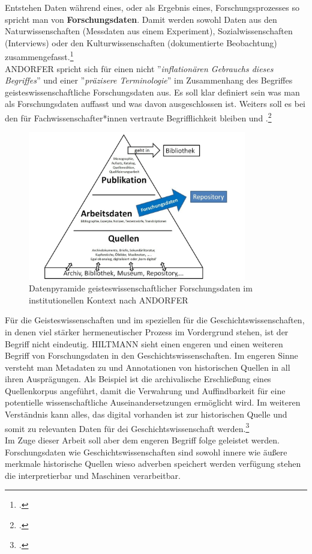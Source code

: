 \documentclass[12pt,a4paper]{article}
\begin{document}
Entstehen Daten während eines, oder als Ergebnis eines, Forschungsprozesses so spricht man von \textbf{Forschungsdaten}. Damit werden sowohl Daten aus den Naturwissenschaften (Messdaten aus einem Experiment), Sozialwissenschaften (Interviews) oder den Kulturwissenschaften (dokumentierte Beobachtung) zusammengefasst.\footcite[][09.06.2019]{kindling2013forschungsdatenmanagement}
\\
ANDORFER spricht sich für einen nicht ''\textit{inflationären Gebrauchs dieses Begriffes}'' und einer ''\textit{präzisere   Terminologie}'' im Zusammenhang des Begriffes geisteswissenschaftliche Forschungsdaten aus. Es soll klar definiert sein was man als Forschungsdaten auffasst und was davon ausgeschlossen ist. Weiters soll es bei den für Fachwissenschafter*innen vertraute Begrifflichkeit bleiben und .\footcite[][]{andorfer2015forschungsdaten}
\begin{figure}[H]
\centering
	\includegraphics[width=0.85\textwidth]{img/forschungsdaten.png}  
    \caption[Datenpyramide geisteswissenschaftlicher Forschungsdaten im institutionellen Kontext, ANDORFER, Peter: Forschungsdaten in den (digitalen) Geisteswissenschaften: Versuch einer Konkretisierung, 2015, S.14]{Datenpyramide geisteswissenschaftlicher Forschungsdaten im institutionellen Kontext nach ANDORFER} \label{fig:forschungsdaten}
\end{figure} 
Für die Geisteswissenschaften und im speziellen für die Geschichtswissenschaften, in denen viel stärker hermeneutischer Prozess  im Vordergrund stehen, ist der Begriff nicht eindeutig. HILTMANN sieht einen engeren und einen weiteren  Begriff von Forschungsdaten in den Geschichtswissenschaften. Im engeren Sinne versteht man Metadaten zu und Annotationen von historischen Quellen in all ihren Ausprägungen. Als Beispiel ist die archivalische Erschließung eines Quellenkorpus angeführt, damit die Verwahrung und Auffindbarkeit für eine potentielle wissenschaftliche Auseinandersetzungen ermöglicht wird. Im weiteren Verständnis kann alles, das digital vorhanden ist zur historischen Quelle und somit zu relevanten Daten für dei Geschichtswissenschaft werden.\footcite[Vgl.][09.06.2019.]{hiltman2018forschungsdaten}
\\
Im Zuge dieser Arbeit soll aber dem engeren Begriff folge geleistet werden. Forschungsdaten wie Geschichtswissenschaften sind sowohl innere wie äußere merkmale historische Quellen wieso adverben speichert werden verfügung stehen die interpretierbar und Maschinen verarbeitbar. 
\end{document}
